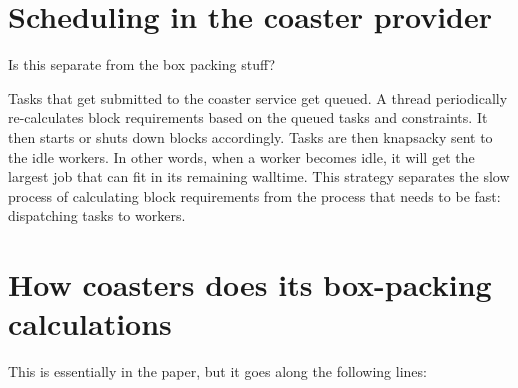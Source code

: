 \documentclass[12pt,letterpaper]{report}
\begin{document}
\section{Scheduling in the coaster provider}

	Is this separate from the box packing stuff?
	
	Tasks that get submitted to the coaster service get queued. A thread periodically re-calculates block requirements based on the queued tasks and constraints. It then starts or shuts down blocks accordingly. Tasks are then knapsacky sent to the idle workers. In other words, when a worker becomes idle, it will get the largest job that can fit in its remaining walltime. This strategy separates the slow process of calculating block requirements from the process that needs to be fast: dispatching tasks to workers.

\section{How coasters does its box-packing calculations}

This is essentially in the paper, but it goes along the following lines:
\end{document}
